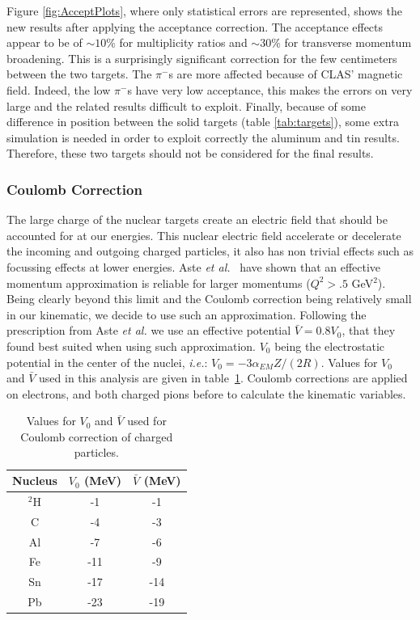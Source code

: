 Figure \ref{fig:AcceptPlots}, where only statistical errors are 
represented, shows the new results after applying the acceptance correction.
The acceptance effects appear to be of $\sim 10$\% for multiplicity ratios and 
$\sim 30$\% for transverse momentum broadening. This is a surprisingly 
significant correction for the few centimeters between the two targets. The 
$\pi^-$s are more affected because of CLAS' magnetic field. Indeed, the low \pt
$\pi^-$s have very low acceptance, this makes the errors 
on \dpt very large and the related results difficult to exploit. Finally, because 
of some difference in position between the solid targets (table 
\ref{tab:targets}), some extra simulation is needed in order to exploit 
correctly the aluminum and tin results. Therefore, these two targets should not be considered for 
the final results.

\subsubsection{Coulomb Correction}
\label{CCor}

The large charge of the nuclear targets create an electric field that should 
be accounted for at our energies. This nuclear electric field accelerate or 
decelerate the incoming and outgoing charged particles, it also has non 
trivial effects such as focussing effects at lower energies. Aste {\it et 
al.}~\cite{Aste:2005wc} have shown that an effective momentum approximation is 
reliable for larger momentums ($Q^2>.5$ GeV$^2$). Being clearly beyond this 
limit and the Coulomb correction being relatively small in our kinematic, we 
decide to use such an approximation. Following the prescription from Aste 
{\it et al.} we use an effective potential $\bar V= 0.8 V_0$, that they found 
best suited when using such approximation. $V_0$ being the electrostatic 
potential in the center of the nuclei, {\it i.e.}: $V_0= -3 \alpha_{EM} Z / 
(2 R)$. Values for $V_0$ and $\bar V$ used in this analysis are given in 
table~\ref{tab:Coulomb}. Coulomb corrections are applied on electrons, and
both charged pions before to calculate the kinematic variables.

\begin{table}[htbp]
  \centering
  \begin{tabular}{@{} ccc @{}}
    \hline
Nucleus & $V_0$ (MeV)  &  $\bar V$ (MeV) \\ \hline
$^2$H  & -1  &     -1 \\
C   &  -4 &      -3 \\
Al  &  -7 &      -6 \\
Fe  & -11 &    -9 \\
Sn  & -17 &   -14 \\
Pb  & -23 &   -19 \\
    \hline
  \end{tabular}
  \caption{Values for $V_0$ and $\bar V$ used for Coulomb correction of charged particles.}
  \label{tab:Coulomb}
\end{table}


